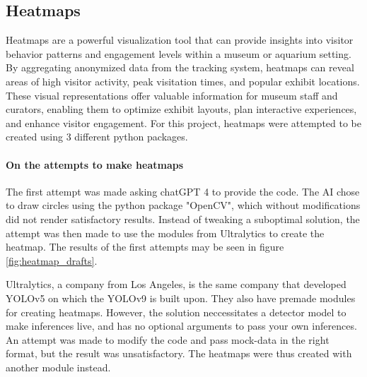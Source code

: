 \subsection{Heatmaps}
\label{sec:heatmaps}
Heatmaps are a powerful visualization tool that can provide insights into visitor behavior patterns and engagement levels within a museum or aquarium setting. By aggregating anonymized data from the tracking system, heatmaps can reveal areas of high visitor activity, peak visitation times, and popular exhibit locations. These visual representations offer valuable information for museum staff and curators, enabling them to optimize exhibit layouts, plan interactive experiences, and enhance visitor engagement. For this project, heatmaps were attempted to be created using 3 different python packages.

\paragraph{On the attempts to make heatmaps}
The first attempt was made asking chatGPT 4 to provide the code. The AI chose to draw circles using the python package "OpenCV", which without modifications did not render satisfactory results. Instead of tweaking a suboptimal solution, the attempt was then made to use the modules from Ultralytics to create the heatmap. The results of the first attempts may be seen in figure \ref{fig:heatmap_drafts}.

Ultralytics, a company from Los Angeles, is the same company that developed YOLOv5 on which the YOLOv9 is built upon. They also have premade modules for creating heatmaps. However, the solution neccessitates a detector model to make inferences live, and has no optional arguments to pass your own inferences. An attempt was made to modify the code and pass mock-data in the right format, but the result was unsatisfactory. The heatmaps were thus created with another module instead.

